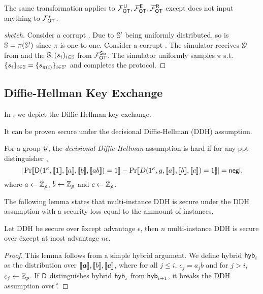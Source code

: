 \begin{remark}
	The same transformation applies to $\mathcal{F}_{\mathsf{OT}}^\mathsf{U},\mathcal{F}_{\mathsf{OT}}^\mathsf{E}, \mathcal{F}_{\mathsf{OT}}^\mathsf{R}$ except \send does not input anything to $\mathcal{F}_{\mathsf{OT}}^*$.
\end{remark}
 

\begin{proof}[sketch]
	Consider a corrupt \send. Due to $\mathsf{\mathbb S}'$ being uniformly distributed, so is $\mathsf{\mathbb S}=\pi(\mathsf{\mathbb S}')$ since $\pi$ is one to one. Consider a corrupt \rec. The simulator receives $\mathsf{\mathbb S}'$ from \rec and the $\mathsf{\mathbb S},(s_i)_{i\in\mathsf{\mathbb S}}$ from $\mathcal{F}_{\mathsf{OT}}^{\mathsf{S} u}$. The simulator uniformly samples $\pi$ s.t. $\{s_i\}_{i\in\mathsf{\mathbb S}} =\{s_{\pi(i)}\}_{i\in\mathsf{\mathbb S}'}$ and completes the protocol.
	\pe
\end{proof}


\subsection{Diffie-Hellman Key Exchange}\label{sec:DDH}
In , we depict the Diffie-Hellman key exchange. 

It can be proven secure under the decisional Diffie-Hellman (DDH) assumption.
\begin{definition}
For a group $\mathcal{G}$, the \emph{decisional Diffie-Hellman} assumption is hard if for any ppt distinguisher \D,
$$
|\Pr\llbracket \mathsf D(1^\kappa,\llbracket 1\rrbracket,\llbracket a\rrbracket,\llbracket b\rrbracket,\llbracket ab\rrbracket)=1\rrbracket-\Pr\llbracket D(1^\kappa,g,\llbracket a\rrbracket,\llbracket b\rrbracket,\llbracket c\rrbracket)=1\rrbracket|=\mathsf{negl},
$$
where $a\leftarrow\mathbb Z_p$, $b\leftarrow\mathbb Z_p$ and $c\leftarrow\mathbb Z_p$.
\end{definition}

The following lemma states that multi-instance DDH is secure under the DDH assumption with a security loss equal to the ammount of instances.

\begin{lemma}\label{lem:DHuniform}
Let DDH be secure over \G except advantage $\epsilon$, then $n$ multi-instance DDH is secure over \G except at most advantage $n\epsilon$.
\end{lemma}

\begin{proof}
This lemma follows from a simple hybrid argument. We define hybrid $\mathsf{hyb}_i$ as the distribution over $\lb \vec{a}\rb,\lb b\rb,\lb \vec{c}\rb$, where for all $j\leq i$, $c_j=a_jb$ and for $j>i$, $c_j\leftarrow\mathbb Z_p$. If $\mathsf D$ distinguishes hybrid $\mathsf{hyb}_i$ from $\mathsf{hyb}_{i+1}$, it breaks the DDH assumption over \G.
\pe
\end{proof}


